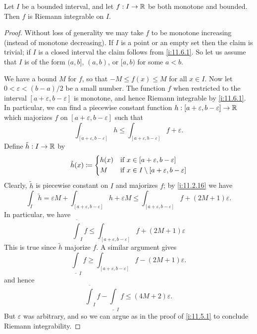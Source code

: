 \begin{cor}\label{i:11.6.3}
  Let \(I\) be a bounded interval, and let \(f : I \to \mathbb{R}\) be both monotone and bounded.
  Then \(f\) is Riemann integrable on \(I\).
\end{cor}

\begin{proof}
  Without loss of generality we may take \(f\) to be monotone increasing (instead of monotone decreasing).
  If \(I\) is a point or an empty set then the claim is trivial;
  if \(I\) is a closed interval the claim follows from \cref{i:11.6.1}.
  So let us assume that \(I\) is of the form \((a, b]\), \((a, b)\), or \([a, b)\) for some \(a < b\).

  We have a bound \(M\) for \(f\), so that \(-M \leq f(x) \leq M\) for all \(x \in I\).
  Now let \(0 < \varepsilon < (b - a) / 2\) be a small number.
  The function \(f\) when restricted to the interval \([a + \varepsilon, b - \varepsilon]\) is monotone, and hence Riemann integrable by \cref{i:11.6.1}.
  In particular, we can find a piecewise constant function \(h : [a + \varepsilon, b - \varepsilon] \to \mathbb{R}\) which majorizes \(f\) on \([a + \varepsilon, b - \varepsilon]\) such that
  \[
    \int_{[a + \varepsilon, b - \varepsilon]} h \leq \int_{[a + \varepsilon, b - \varepsilon]} f + \varepsilon.
  \]
  Define \(\tilde{h} : I \to \mathbb{R}\) by
  \[
    \tilde{h}(x) \coloneqq \begin{dcases}
      h(x) & \text{if } x \in [a + \varepsilon, b - \varepsilon]             \\
      M    & \text{if } x \in I \setminus [a + \varepsilon, b - \varepsilon]
    \end{dcases}
  \]
  Clearly, \(\tilde{h}\) is piecewise constant on \(I\) and majorizes \(f\);
  by \cref{i:11.2.16} we have
  \[
    \int_I \tilde{h} = \varepsilon M + \int_{[a + \varepsilon, b - \varepsilon]} h + \varepsilon M \leq \int_{[a + \varepsilon, b - \varepsilon]} f + (2M + 1) \varepsilon.
  \]
  In particular, we have
  \[
    \overline{\int}_I f \leq \int_{[a + \varepsilon, b - \varepsilon]} f + (2M + 1) \varepsilon
  \]
  This is true since \(\tilde{h}\) majorize \(f\).
  A similar argument gives
  \[
    \underline{\int}_I f \geq \int_{[a + \varepsilon, b - \varepsilon]} f - (2M + 1) \varepsilon.
  \]
  and hence
  \[
    \overline{\int}_I f - \underline{\int}_I f \leq (4M + 2) \varepsilon.
  \]
  But \(\varepsilon\) was arbitrary, and so we can argue as in the proof of \cref{i:11.5.1} to conclude Riemann integrability.
\end{proof}

